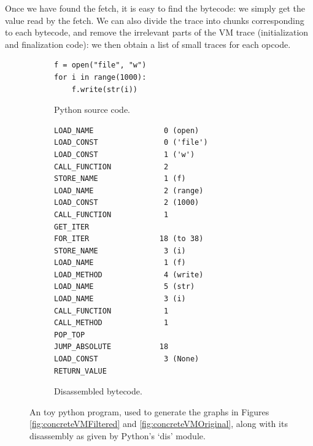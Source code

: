 \documentclass[english]{article}
\begin{document}
Once we have found the fetch, it is easy to find the bytecode: we simply get the value read by the fetch. We can also divide the trace into chunks corresponding to each bytecode, and remove the irrelevant parts of the VM trace (initialization and finalization code): we then obtain a list of small traces for each opcode.

\begin{figure}[htp]
	\centering 
	\begin{subfigure}{.5\textwidth}
		\centering 	
		\begin{BVerbatim}
f = open("file", "w")
for i in range(1000):
	f.write(str(i))
		\end{BVerbatim}
		\caption{Python source code.}
		\label{fig:examplePythonProg:source}
	\end{subfigure}%
	\begin{subfigure}{.5\textwidth}
		\centering 	
		\begin{BVerbatim}
LOAD_NAME                0 (open)
LOAD_CONST               0 ('file')
LOAD_CONST               1 ('w')
CALL_FUNCTION            2
STORE_NAME               1 (f)
LOAD_NAME                2 (range)
LOAD_CONST               2 (1000)
CALL_FUNCTION            1
GET_ITER
FOR_ITER                18 (to 38)
STORE_NAME               3 (i)
LOAD_NAME                1 (f)
LOAD_METHOD              4 (write)
LOAD_NAME                5 (str)
LOAD_NAME                3 (i)
CALL_FUNCTION            1
CALL_METHOD              1
POP_TOP
JUMP_ABSOLUTE           18
LOAD_CONST               3 (None)
RETURN_VALUE
		\end{BVerbatim}
		\caption{Disassembled bytecode.}
		\label{fig:examplePythonProg:bytecode}
	\end{subfigure}
	\caption{An toy python program, used to generate the graphs in Figures 	\ref{fig:concreteVMFiltered} and \ref{fig:concreteVMOriginal}, along with its disassembly as given by Python's `dis' module.}
	\label{fig:examplePythonProg}
\end{figure}
\end{document}
